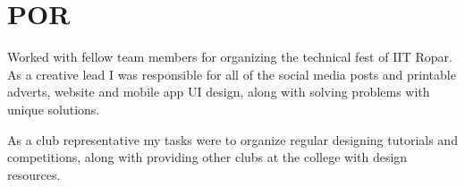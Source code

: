\documentclass[]{deedy-resume-openfont}
\begin{document}
\begin{minipage}[t]{0.62\textwidth}

\section{POR}
Worked with fellow team members for organizing the technical fest of IIT Ropar. As a creative lead I was responsible for all of the social media posts and printable adverts, website and mobile app UI design, along with solving problems with unique solutions.  

As a club representative my tasks were to organize regular designing tutorials and competitions, along with providing other clubs at the college with design resources.   









\end{minipage}
\end{document}
